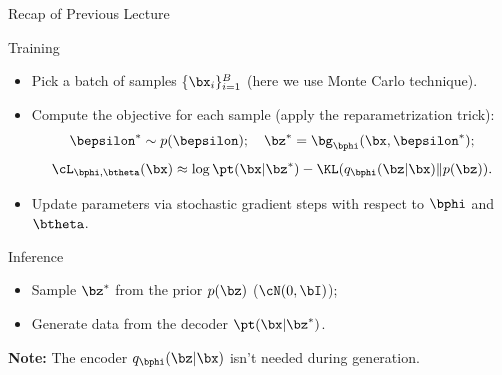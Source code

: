 \documentclass{beamer}
\begin{document}
\begin{frame}{Recap of Previous Lecture}
	\begin{block}{Training}
		\begin{itemize}
			\item Pick a batch of samples \{$\bx_i\}_{i=1}^B$ (here we use Monte Carlo technique).
			\item Compute the objective for each sample (apply the reparametrization trick):
			\vspace{-0.3cm}
			\[
				\bepsilon^* \sim p(\bepsilon); \quad \bz^* = \bg_{\bphi}(\bx, \bepsilon^*);
			\]
			\[
				\cL_{\bphi, \btheta}(\bx) \approx  \log \pt(\bx | \bz^*) - \KL(q_{\bphi}(\bz| \bx) \| p(\bz)).
			\]
			\vspace{-0.5cm}
			\item Update parameters via stochastic gradient steps with respect to $\bphi$ and $\btheta$.
		\end{itemize}
	\end{block}
	\begin{block}{Inference}
		\begin{itemize}
			\item Sample $\bz^*$ from the prior $p(\bz)$ ($\cN(0, \bI)$);
			\item Generate data from the decoder $\pt(\bx | \bz^*)$.
		\end{itemize}
	\end{block}
	\textbf{Note:} The encoder $q_{\bphi}(\bz| \bx)$ isn't needed during generation.
\end{frame}
\end{document}
